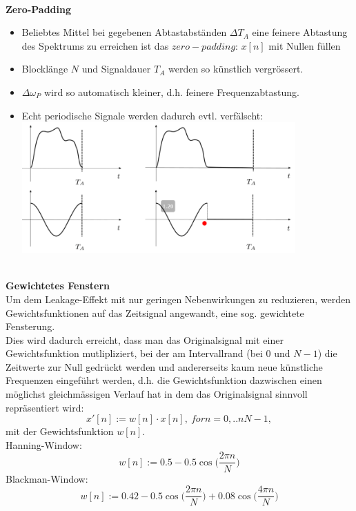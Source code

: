\documentclass[12pt,a4paper]{scrartcl}
\begin{document}
 \noindent  \\ \textbf{Zero-Padding}
 \begin{itemize}
   \item Beliebtes Mittel bei gegebenen Abtastabständen $\Delta T_A$ eine feinere Abtastung des Spektrums zu erreichen ist das $zero-padding$: $x[n]$ mit Nullen füllen
   \item Blocklänge $N$ und Signaldauer $T_A$ werden so künstlich vergrössert. 
   \item $\Delta \omega_P$ wird so automatisch kleiner, d.h. feinere Frequenzabtastung.
   \item Echt periodische Signale werden dadurch evtl. verfälscht: \\ \includegraphics[height =5cm]{Pictures/ZeroPadding.png} 
 \end{itemize}

 \noindent  \\ \textbf{Gewichtetes Fenstern}
\\ Um dem Leakage-Effekt mit nur geringen Nebenwirkungen zu reduzieren, werden Gewichtsfunktionen auf das Zeitsignal angewandt, eine sog. gewichtete Fensterung.\\

 \noindent Dies wird dadurch erreicht, dass man das Originalsignal mit einer Gewichtsfunktion mutlipliziert, 
 bei der am Intervallrand (bei $0$ und $N-1$) die Zeitwerte zur Null gedrückt werden und andererseits kaum neue künstliche Frequenzen eingeführt werden, 
 d.h. die Gewichtsfunktion dazwischen einen möglichst gleichmässigen Verlauf hat in dem das Originalsignal sinnvoll repräsentiert wird: 
 $$x' [n] := w[n] \cdot x[n],\ for n = {0,..nN-1},$$ mit der Gewichtsfunktion $w[n]$.\\

\noindent Hanning-Window:
$$w[n] := 0.5 - 0.5 \cos\bigg(\frac{2\pi n}{N}\bigg)$$
 Blackman-Window:
$$w[n] := 0.42 - 0.5 \cos\bigg(\frac{2\pi n}{N}\bigg) + 0.08 \cos\bigg(\frac{4\pi n}{N}\bigg)$$ 
\end{document}
